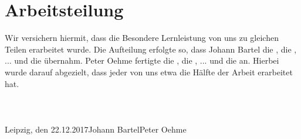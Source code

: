 \chapter*{Arbeitsteilung}
Wir versichern hiermit, dass die Besondere Lernleistung von uns zu gleichen Teilen erarbeitet wurde.
Die Aufteilung erfolgte so, dass Johann Bartel die , die , ... und die  übernahm.
Peter Oehme fertigte die , die , ... und die  an.
Hierbei wurde darauf abgezielt, dass jeder von uns etwa die Hälfte der Arbeit erarbeitet hat. \\\\\\\\
Leipzig, den 22.12.2017\tab Johann Bartel\tab \tab Peter Oehme